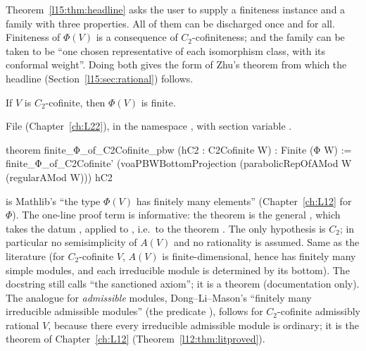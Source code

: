 Theorem~\ref{l15:thm:headline} asks the user to supply a finiteness instance and a family with three properties. All of
them can be discharged once and for all. Finiteness of $\Phi(V)$ is a consequence of $C_2$-cofiniteness; and the family can
be taken to be ``one chosen representative of each isomorphism class, with its conformal weight''. Doing both gives the
form of Zhu's theorem from which the headline (Section~\ref{l15:sec:rational}) follows.

\begin{theorem}\label{l15:thm:finitephi}
If $V$ is $C_2$-cofinite, then $\Phi(V)$ is finite.
\end{theorem}
\noindent File 
(Chapter~\ref{ch:L22}), in the namespace , with section variable
.
\begin{leancode}
theorem finite_Φ_of_C2Cofinite_pbw (hC2 : C2Cofinite W) : Finite (Φ W) :=
  finite_Φ_of_C2Cofinite' (voaPBWBottomProjection (parabolicRepOfAMod W (regularAMod W))) hC2
\end{leancode}

\begin{dictionary}
 is Mathlib's ``the type $\Phi(V)$ has finitely many elements'' (Chapter~\ref{ch:L12} for $\Phi$). The
one-line proof term is informative: the theorem is the general , which takes the datum
, applied to , i.e.\ to the theorem . The only hypothesis is $C_2$; in
particular no semisimplicity of $A(V)$ and no rationality is assumed. Same as the literature (for $C_2$-cofinite $V$,
$A(V)$ is finite-dimensional, hence has finitely many simple modules, and each irreducible module is determined by its
bottom). The docstring still calls  ``the sanctioned axiom''; it is a theorem (documentation only). The
analogue for \emph{admissible} modules, Dong--Li--Mason's ``finitely many irreducible admissible modules'' (the predicate
), follows for $C_2$-cofinite admissibly rational $V$, because there every irreducible
admissible module is ordinary; it is the theorem  of
Chapter~\ref{ch:L12} (Theorem~\ref{l12:thm:litproved}).
\end{dictionary}

